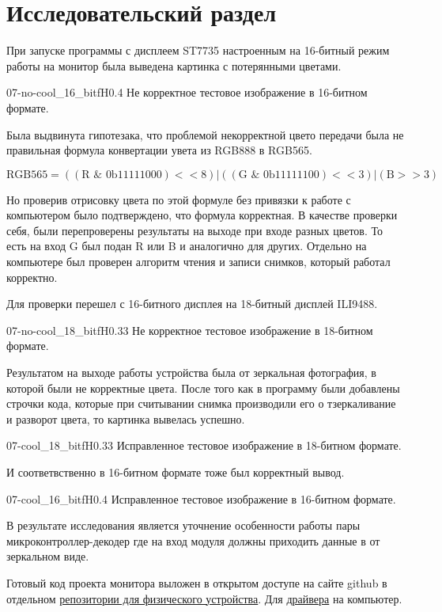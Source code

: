 \chapter{Исследовательский раздел}


	При запуске программы с дисплеем ST7735 настроенным на 16-битный режим работы на монитор была выведена картинка с потерянными цветами.
	
	{07-no-cool_16_bit}{f}{H}{0.4\textwidth}
	{Не корректное тестовое изображение в 16-битном формате.} %
	
	Была выдвинута гипотезака, что проблемой некорректной цвето передачи была не правильная формула конвертации увета из RGB888 в RGB565.
	
	\[\text{RGB565} = ((\text{R } \& \text{ 0b}11111000) << 8) | ((\text{G } \& \text{ 0b}11111100) << 3) | (\text{B} >> 3)\]
	
	Но проверив отрисовку цвета по этой формуле без привязки к работе с компьютером было подтверждено, что формула корректная. В качестве проверки себя, были перепроверены результаты на выходе при входе разных цветов. То есть на вход G был подан R или B и аналогично для других. Отдельно на компьютере был проверен алгоритм чтения и записи снимков, который работал корректно.
	
	Для проверки перешел с 16-битного дисплея на 18-битный дисплей ILI9488.
	
	{07-no-cool_18_bit}{f}{H}{0.33\textwidth}
	{Не корректное тестовое изображение в 18-битном формате.} %
	
	Результатом на выходе работы устройства была от зеркальная фотография, в которой были не корректные цвета. После того как в программу были добавлены строчки кода, которые при считывании снимка производили его о тзеркаливание и разворот цвета, то картинка вывелась успешно.
	
	{07-cool_18_bit}{f}{H}{0.33\textwidth}
	{Исправленное тестовое изображение в 18-битном формате.} %
	
	И соответвственно в 16-битном формате тоже был корректный вывод.
	
	{07-cool_16_bit}{f}{H}{0.4\textwidth}
	{Исправленное тестовое изображение в 16-битном формате.} %
	
	В результате исследования является уточнение особенности работы пары микроконтроллер-декодер где на вход модуля должны приходить данные в от зеркальном виде.
	
	Готовый код проекта монитора выложен в открытом доступе на сайте github в отдельном \href{https://github.com/khosta77/stm32f4_ILI9488}{репозитории для физического устройства}. Для \href{https://github.com/khosta77/ft2xx_fast_start}{драйвера} на компьютер.
	
	